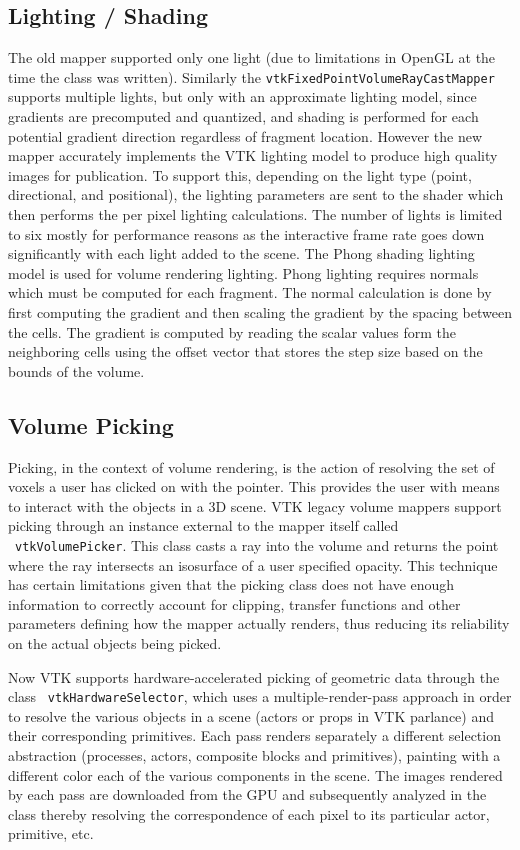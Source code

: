 \subsection{Lighting / Shading}
The old mapper supported only one light (due to limitations in OpenGL at the
time the class was written). Similarly the \texttt{vtkFixedPointVolumeRayCastMapper}
supports multiple lights, but only with an approximate lighting model, since
gradients are precomputed and quantized, and shading is performed for each
potential gradient direction regardless of fragment location. However the new mapper
accurately implements the VTK lighting model to produce high quality images for
publication. To support this, depending on the light type (point, directional,
and positional), the lighting parameters are sent to the shader which then
performs the per pixel lighting calculations. The number of lights is limited to
six mostly for performance reasons as the interactive frame rate goes down
significantly with each light added to the scene. The Phong shading lighting
model is used for volume rendering lighting. Phong lighting requires normals
which must be computed for each fragment. The normal calculation is done by
first computing the gradient and then scaling the gradient by the spacing
between the cells. The gradient is computed by reading the scalar values form
the neighboring cells using the offset vector that stores the step size based
on the bounds of the volume.

\subsection{Volume Picking}
Picking, in the context of volume rendering, is the action of resolving the set
of voxels a user has clicked on with the pointer. This provides the user with
means to interact with the objects in a 3D scene. VTK legacy volume mappers
support picking through an instance external to the mapper itself called
~\texttt{vtkVolumePicker}.  This class casts a ray into the volume and returns
the point where the ray intersects an isosurface of a user specified opacity.
This technique has certain limitations given that the picking class does not
have enough information to correctly account for clipping, transfer functions
and other parameters defining how the mapper actually renders, thus reducing its
reliability on the actual objects being picked.

Now VTK supports hardware-accelerated picking of geometric data through the class
~\texttt{vtkHardwareSelector}, which uses a multiple-render-pass approach in
order to resolve the various objects in a scene (actors or props in VTK parlance) and
their corresponding primitives.  Each pass renders separately a different
selection abstraction (processes, actors, composite blocks and primitives),
painting with a different color each of the various components in the scene.
The images rendered by each pass are downloaded from the GPU and subsequently
analyzed in the class thereby resolving the correspondence of each pixel to its
particular actor, primitive, etc.

